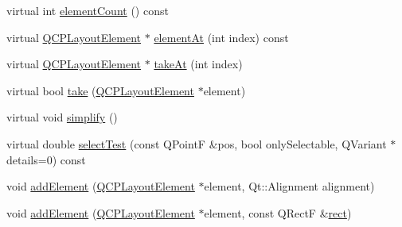 \begin{DoxyCompactItemize}
\item 
virtual int \hyperlink{classQCPLayoutInset_a2087b97b9266fd9e0f571a8d3cf709f9}{element\-Count} () const 
\item 
virtual \hyperlink{classQCPLayoutElement}{\-Q\-C\-P\-Layout\-Element} $\ast$ \hyperlink{classQCPLayoutInset_ab096d07b08f9b5455647f3ba7ff60e27}{element\-At} (int index) const 
\item 
virtual \hyperlink{classQCPLayoutElement}{\-Q\-C\-P\-Layout\-Element} $\ast$ \hyperlink{classQCPLayoutInset_ad6756a3b507e20496aaf7f5ca16c47d1}{take\-At} (int index)
\item 
virtual bool \hyperlink{classQCPLayoutInset_a9ac707ccff650633b97f52dd5cddcf49}{take} (\hyperlink{classQCPLayoutElement}{\-Q\-C\-P\-Layout\-Element} $\ast$element)
\item 
virtual void \hyperlink{classQCPLayoutInset_abb9eb23bf2d7c587a8abe02d065eae0a}{simplify} ()
\item 
virtual double \hyperlink{classQCPLayoutInset_ab5a2f2b88c05e369fd7da9583d17aa3a}{select\-Test} (const \-Q\-Point\-F \&pos, bool only\-Selectable, \-Q\-Variant $\ast$details=0) const 
\item 
void \hyperlink{classQCPLayoutInset_ad61529eb576af7f04dff94abb10c745a}{add\-Element} (\hyperlink{classQCPLayoutElement}{\-Q\-C\-P\-Layout\-Element} $\ast$element, \-Qt\-::\-Alignment alignment)
\item 
void \hyperlink{classQCPLayoutInset_a8ff61fbee4a1f0ff45c398009d9f1e56}{add\-Element} (\hyperlink{classQCPLayoutElement}{\-Q\-C\-P\-Layout\-Element} $\ast$element, const \-Q\-Rect\-F \&\hyperlink{classQCPLayoutElement_affdfea003469aac3d0fac5f4e06171bc}{rect})
\end{DoxyCompactItemize}
